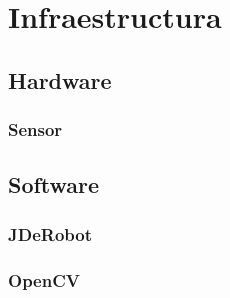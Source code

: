 
\chapter{Infraestructura} %

\label{Chapter1} %

\section{Hardware}

\subsection{Sensor}


\section{Software}


\subsection{JDeRobot}

\subsection{OpenCV}